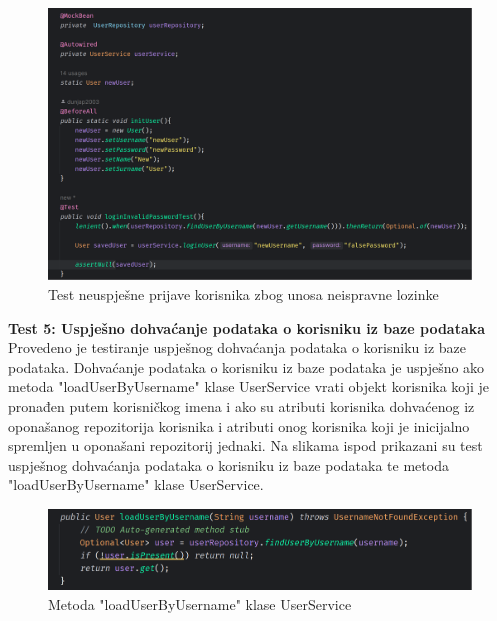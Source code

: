 				\begin{figure}[H]
			\includegraphics[scale=0.4]{slike/loginInvalidPasswordTest.PNG} %
			\centering
			\caption{Test neuspješne prijave korisnika zbog unosa neispravne lozinke}
			\label{Test neuspješne prijave korisnika zbog unosa neispravne lozinke}
		\end{figure}
		
\textbf{Test 5: Uspješno dohvaćanje podataka o korisniku iz baze podataka} \\

Provedeno je testiranje uspješnog dohvaćanja podataka o korisniku iz baze podataka. Dohvaćanje podataka o korisniku iz baze podataka je uspješno ako metoda "loadUserByUsername" klase UserService vrati objekt korisnika koji je pronađen putem korisničkog imena i ako su atributi korisnika dohvaćenog iz oponašanog repozitorija korisnika i atributi onog korisnika koji je inicijalno spremljen u oponašani repozitorij jednaki. Na slikama ispod prikazani su test uspješnog dohvaćanja podataka o korisniku iz baze podataka te metoda "loadUserByUsername" klase UserService.

				\begin{figure}[H]
			\includegraphics[scale=0.4]{slike/loadUserByUsername.PNG} %
			\centering
			\caption{Metoda "loadUserByUsername" klase UserService}
			\label{Metoda "loadUserByUsername" klase UserService}
		\end{figure}
		
